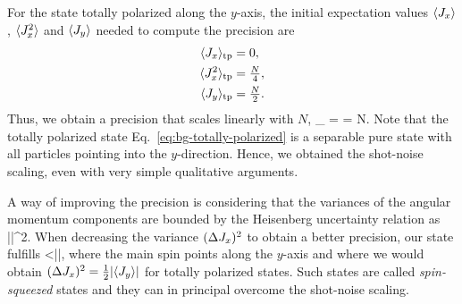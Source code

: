 For the state totally polarized along the $y$-axis, the initial expectation values $\langle{J_x}\rangle$, $\langle{J_x^2}\rangle$ and $\langle{J_y}\rangle$ needed to compute the precision are
\begin{subequations}
  \begin{align}
    \langle{J_x}\rangle_{\text{tp}}  & = 0,\\
    \langle{J_x^2}\rangle_{\text{tp}}  & = \tfrac{N}{4},\\
    \langle{J_y}\rangle_{\text{tp}}  & = \tfrac{N}{2}.
  \end{align}
\end{subequations}
Thus, we obtain a precision that scales linearly with $N$,
\be
  \varinv{\theta}_{} =  = N.
\ee
Note that the totally polarized state Eq.~\eqref{eq:bg-totally-polarized} is a separable pure state with all particles pointing into the $y$-direction.
Hence, we obtained the shot-noise scaling, even with very simple qualitative arguments.

A way of improving the precision is considering that the variances of the angular momentum components are bounded by the Heisenberg uncertainty relation as \cite{Kitagawa1993}
\be
   \geqslant {}||^2.
\ee
When decreasing the variance $(\Delta J_x )^2$ to obtain a better precision, our state fulfills
\be
  <||,
\ee
where the main spin points along the $y$-axis and where we would obtain $(\Delta J_x )^2=\frac{1}{2}|\langle{J_y}\rangle|$ for totally polarized states.
Such states are called \emph{spin-squeezed} states \cite{Kitagawa1993, Wineland1994, Sorensen2001, Ma2011} and they can in principal overcome the shot-noise scaling.

